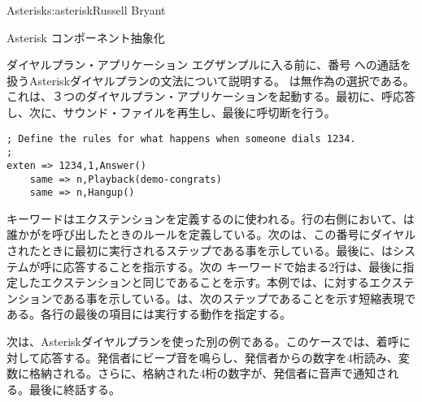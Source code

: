 \begin{aosachapter}{Asterisk}{s:asterisk}{Russell Bryant}
\begin{aosasect1}{Asterisk コンポーネント抽象化}
\begin{aosasect2}{ダイヤルプラン・アプリケーション}
エグザンプルに入る前に、番号 への通話を扱うAsteriskダイヤルプランの文法について説明する。 は無作為の選択である。これは、３つのダイヤルプラン・アプリケーションを起動する。最初に、呼応答し、次に、サウンド・ファイルを再生し、最後に呼切断を行う。

\begin{verbatim}
; Define the rules for what happens when someone dials 1234.
;
exten => 1234,1,Answer()
    same => n,Playback(demo-congrats)
    same => n,Hangup()
\end{verbatim}

\noindent {} キーワードはエクステンションを定義するのに使われる。行の右側において、は誰かがを呼び出したときのルールを定義している。次のは、この番号にダイヤルされたときに最初に実行されるステップである事を示している。最後に、はシステムが呼に応答することを指示する。次の キーワードで始まる2行は、最後に指定したエクステンションと同じであることを示す。本例では、に対するエクステンションである事を示している。は、次のステップであることを示す短縮表現である。各行の最後の項目には実行する動作を指定する。

次は、Asteriskダイヤルプランを使った別の例である。このケースでは、着呼に対して応答する。発信者にビープ音を鳴らし、発信者からの数字を4桁読み、変数に格納される。さらに、格納された4桁の数字が、発信者に音声で通知される。最後に終話する。


\end{aosasect2}
\end{aosasect1}
\end{aosachapter}
